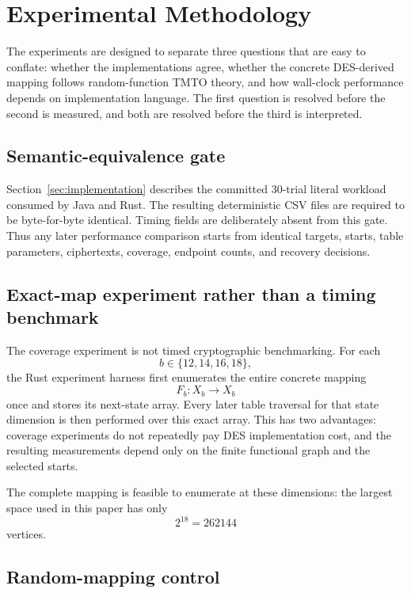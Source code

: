 \section{Experimental Methodology}
\label{sec:experiments}

The experiments are designed to separate three questions that are easy to
conflate: whether the implementations agree, whether the concrete DES-derived
mapping follows random-function TMTO theory, and how wall-clock performance
depends on implementation language.  The first question is resolved before the
second is measured, and both are resolved before the third is interpreted.

\subsection{Semantic-equivalence gate}

Section~\ref{sec:implementation} describes the committed 30-trial literal
workload consumed by Java and Rust.  The resulting deterministic CSV files are
required to be byte-for-byte identical.  Timing fields are deliberately absent
from this gate.  Thus any later performance comparison starts from identical
targets, starts, table parameters, ciphertexts, coverage, endpoint counts, and
recovery decisions.

\subsection{Exact-map experiment rather than a timing benchmark}

The coverage experiment is not timed cryptographic benchmarking.  For each
\[
  b\in\{12,14,16,18\},
\]
the Rust experiment harness first enumerates the entire concrete mapping
\[
  F_b:X_b\to X_b
\]
once and stores its next-state array.  Every later table traversal for that
state dimension is then performed over this exact array.  This has two
advantages: coverage experiments do not repeatedly pay DES implementation
cost, and the resulting measurements depend only on the finite functional
graph and the selected starts.

The complete mapping is feasible to enumerate at these dimensions: the largest
space used in this paper has only
\[
  2^{18}=262144
\]
vertices.

\subsection{Random-mapping control}


